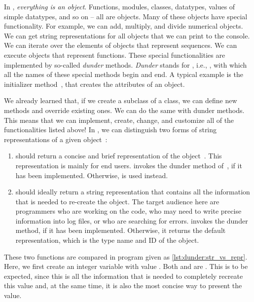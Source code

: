 %
%
In \python, \emph{everything is an object}.
Functions, modules, classes, datatypes, values of simple datatypes, and so on -- all are objects.
Many of these objects have special functionality.
For example, we can add, multiply, and divide numerical objects.
We can get string representations for all objects that we can print to the console.
We can iterate over the elements of objects that represent sequences.
We can execute objects that represent functions.
These special functionalities are implemented by so-called \emph{dunder} methods.
\emph{Dunder} stands for , i.e., \pythonilIdx{\_\_}, with which all the names of these special methods begin and end.
A typical example is the initializer method~, that creates the attributes of an object.

We already learned that, if we create a subclass of a class, we can define new methods and override existing ones.
We can do the same with dunder methods.
This means that we can implement, create, change, and customize all of the functionalities listed above!%
%
%
\label{sec:strReprEq}%
%
%
%
%
In \python, we can distinguish two forms of string representations of a given object~:%
%
\begin{enumerate}%
%
\item {} should return a concise and brief representation of the object~.
This representation is mainly for end users.
 invokes the  dunder method of~, if it has been implemented.
Otherwise,  is used instead.%
%
\item {} should ideally return a string representation that contains all the information that is needed to re-create the object.
The target audience here are programmers who are working on the code, who may need to write precise information into log files, or who are searching for errors.
 invokes the  dunder method, if it has been implemented.
Otherwise, it returns the default representation, which is the type name and ID of the object.%
%
\end{enumerate}%
%
These two functions are compared in program  given as \cref{lst:dunder:str_vs_repr}.
Here, we first create an integer variable  with value .
Both  and  are .
This is to be expected, since this is all the information that is needed to completely recreate this value and, at the same time, it is also the most concise way to present the value.

